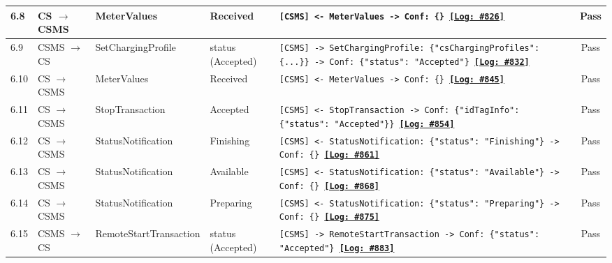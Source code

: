 \documentclass[10pt, a4paper, landscape]{article}
\begin{document}
\begin{longtable}{|p{1.0cm}|p{2.5cm}|p{4.0cm}|p{5.0cm}|p{10.0cm}|c|}
\hline
6.8 & CS $\to$ CSMS & MeterValues & Received & \footnotesize\texttt{[CSMS] <- MeterValues \newline [CSMS] -> Conf: \{\} \newline \hyperref[log:6.8]{\textbf{[Log: \#826]}}} & Pass \\
\hline
6.9 & CSMS $\to$ CS & SetChargingProfile & status (Accepted) & \footnotesize\texttt{[CSMS] -> SetChargingProfile: \{"csChargingProfiles": \{...\}\} \newline [CS] -> Conf: \{"status": "Accepted"\} \newline \hyperref[log:6.9]{\textbf{[Log: \#832]}}} & Pass \\
\hline
6.10 & CS $\to$ CSMS & MeterValues & Received & \footnotesize\texttt{[CSMS] <- MeterValues \newline [CSMS] -> Conf: \{\} \newline \hyperref[log:6.10]{\textbf{[Log: \#845]}}} & Pass \\
\hline
6.11 & CS $\to$ CSMS & StopTransaction & Accepted & \footnotesize\texttt{[CSMS] <- StopTransaction \newline [CSMS] -> Conf: \{"idTagInfo": \{"status": "Accepted"\}\} \newline \hyperref[log:6.11]{\textbf{[Log: \#854]}}} & Pass \\
\hline
6.12 & CS $\to$ CSMS & StatusNotification & Finishing & \footnotesize\texttt{[CSMS] <- StatusNotification: \{"status": "Finishing"\} \newline [CSMS] -> Conf: \{\} \newline \hyperref[log:6.12]{\textbf{[Log: \#861]}}} & Pass \\
\hline
6.13 & CS $\to$ CSMS & StatusNotification & Available & \footnotesize\texttt{[CSMS] <- StatusNotification: \{"status": "Available"\} \newline [CSMS] -> Conf: \{\} \newline \hyperref[log:6.13]{\textbf{[Log: \#868]}}} & Pass \\
\hline
6.14 & CS $\to$ CSMS & StatusNotification & Preparing & \footnotesize\texttt{[CSMS] <- StatusNotification: \{"status": "Preparing"\} \newline [CSMS] -> Conf: \{\} \newline \hyperref[log:6.14]{\textbf{[Log: \#875]}}} & Pass \\
\hline
6.15 & CSMS $\to$ CS & RemoteStartTransaction & status (Accepted) & \footnotesize\texttt{[CSMS] -> RemoteStartTransaction \newline [CS] -> Conf: \{"status": "Accepted"\} \newline \hyperref[log:6.15]{\textbf{[Log: \#883]}}} & Pass \\

\end{longtable}
\end{document}
